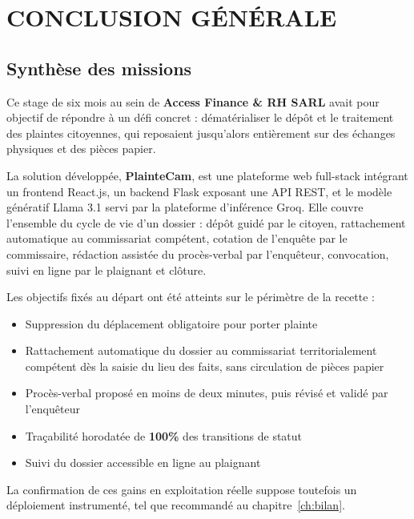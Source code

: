 
\chapter*{CONCLUSION GÉNÉRALE}
\label{ch:conclusion}

\section*{Synthèse des missions}

Ce stage de six mois au sein de \textbf{Access Finance \& RH SARL} avait pour objectif de répondre à un défi concret : dématérialiser le dépôt et le traitement des plaintes citoyennes, qui reposaient jusqu'alors entièrement sur des échanges physiques et des pièces papier.

La solution développée, \textbf{PlainteCam}, est une plateforme web full-stack intégrant un frontend React.js, un backend Flask exposant une API REST, et le modèle génératif Llama 3.1 servi par la plateforme d'inférence Groq. Elle couvre l'ensemble du cycle de vie d'un dossier : dépôt guidé par le citoyen, rattachement automatique au commissariat compétent, cotation de l'enquête par le commissaire, rédaction assistée du procès-verbal par l'enquêteur, convocation, suivi en ligne par le plaignant et clôture.

Les objectifs fixés au départ ont été atteints sur le périmètre de la recette :

\begin{itemize}
    \item Suppression du déplacement obligatoire pour porter plainte
    \item Rattachement automatique du dossier au commissariat territorialement compétent dès la saisie du lieu des faits, sans circulation de pièces papier
    \item Procès-verbal proposé en moins de deux minutes, puis révisé et validé par l'enquêteur
    \item Traçabilité horodatée de \textbf{100\%} des transitions de statut
    \item Suivi du dossier accessible en ligne au plaignant
\end{itemize}

La confirmation de ces gains en exploitation réelle suppose toutefois un déploiement instrumenté, tel que recommandé au chapitre~\ref{ch:bilan}.

